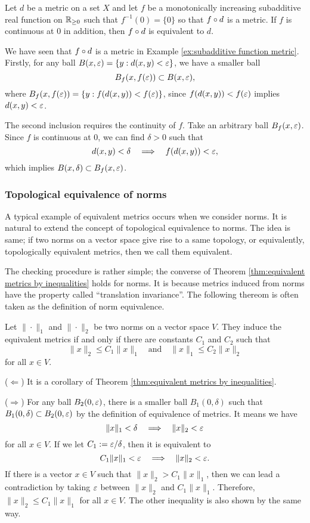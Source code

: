 \begin{thm}\label{thm:equivalent metrics by subadditive function}
Let $d$ be a metric on a set $X$ and let $f$ be a monotonically increasing subadditive real function on $\mathbb{R}_{\ge0}$ such that $f^{-1}(0)=\{0\}$ so that $f\o d$ is a metric.
If $f$ is continuous at 0 in addition, then $f\o d$ is equivalent to $d$.
\end{thm}
\begin{pf}
We have seen that $f\o d$ is a metric in Example \ref{ex:subadditive function metric}.
Firstly, for any ball $B(x,\varepsilon)=\{y:d(x,y)<\varepsilon\}$, we have a smaller ball
\[B_f(x,f(\varepsilon))\subset B(x,\varepsilon),\]
where $B_f(x,f(\varepsilon))=\{y:f(d(x,y))<f(\varepsilon)\}$, since $f(d(x,y))<f(\varepsilon)$ implies $d(x,y)<\varepsilon$.

The second inclusion requires the continuity of $f$.
Take an arbitrary ball $B_f(x,\varepsilon)$.
Since $f$ is continuous at 0, we can find $\delta>0$ such that
\[d(x,y)<\delta\impl f(d(x,y))<\e,\]
which implies $B(x,\delta)\subset B_f(x,\varepsilon)$.
\end{pf}

\subsubsection{Topological equivalence of norms}

A typical example of equivalent metrics occurs when we consider norms.
It is natural to extend the concept of topological equivalence to norms.
The idea is same; if two norms on a vector space give rise to a same topology, or equivalently, topologically equivalent metrics, then we call them equivalent.

The checking procedure is rather simple; the converse of Theorem \ref{thm:equivalent metrics by inequalities} holds for norms.
It is because metrics induced from norms have the property called ``translation invariance''.
The following thereom is often taken as the definition of norm equivalence.

\begin{thm}
Let $\|\cdot\|_1$ and $\|\cdot\|_2$ be two norms on a vector space $V$.
They induce the equivalent metrics if and only if there are constants $C_1$ and $C_2$ such that
\[\|x\|_2\le C_1\|x\|_1\quad\text{and}\quad\|x\|_1\le C_2\|x\|_2\]
for all $x\in V$.
\end{thm}
\begin{pf}
($\Leftarrow$) It is a corollary of Theorem \ref{thm:equivalent metrics by inequalities}.

($\Rightarrow$)
For any ball $B_2(0,\varepsilon)$, there is a smaller ball $B_1(0,\delta)$ such that $B_1(0,\delta)\subset B_2(0,\varepsilon)$ by the definition of equivalence of metrics.
It means we have
\[\|x\|_1<\delta\impl\|x\|_2<\e\]
for all $x\in V$.
If we let $C_1:=\varepsilon/\delta$, then it is equivalent to
\[C_1\|x\|_1<\e\impl\|x\|_2<\e.\]
If there is a vector $x\in V$ such that $\|x\|_2>C_1\|x\|_1$, then we can lead a contradiction by taking $\varepsilon$ between $\|x\|_2$ and $C_1\|x\|_1$.
Therefore, $\|x\|_2\le C_1\|x\|_1$ for all $x\in V$.
The other inequality is also shown by the same way.
\end{pf}

